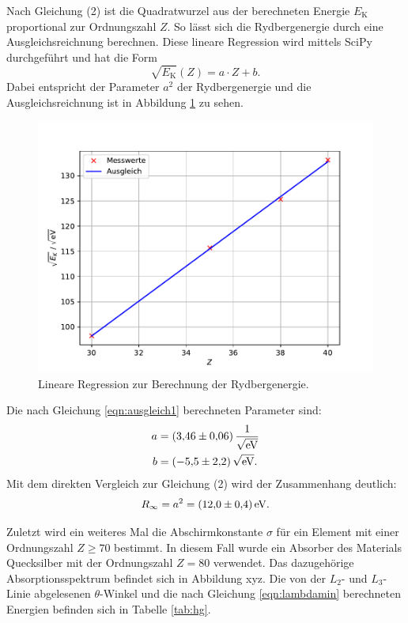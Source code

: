 \noindent Nach Gleichung (2) ist die Quadratwurzel aus der berechneten Energie $E_\text{K}$ proportional zur Ordnungszahl $Z$. So lässt sich die
Rydbergenergie durch eine Ausgleichsreichnung berechnen. Diese lineare Regression wird mittels SciPy durchgeführt und hat die Form
\begin{equation}
\label{eqn:ausgleich1}
  \sqrt{E_\text{K}}(Z) = a \cdot Z + b.
\end{equation}
Dabei entspricht der Parameter $a^2$ der Rydbergenergie und die Ausgleichsreichnung ist in Abbildung \ref{fig:ausgleich} zu sehen.
\begin{figure}[H]
  \center
  \includegraphics[scale = 0.75]{rydberg.pdf}
  \caption{Lineare Regression zur Berechnung der Rydbergenergie.}
  \label{fig:ausgleich}
\end{figure}
\noindent Die nach Gleichung \eqref{eqn:ausgleich1} berechneten Parameter sind:
\begin{align*}
a &= (\num{3.46 +- 0.06})\,\frac{1}{\sqrt{\si{\electronvolt}}} \\
b &= (\num{-5.5 +- 2.2})\,\sqrt{\si{\electronvolt}}.
\end{align*}
Mit dem direkten Vergleich zur Gleichung (2) wird der Zusammenhang deutlich:
\begin{align*}
R_\infty = a^2 = (\num{12.0 +- 0.4})\,\si{\electronvolt}.
\end{align*}

Zuletzt wird ein weiteres Mal die Abschirmkonstante $\sigma$ für ein Element mit einer Ordnungszahl $Z \geq 70$ bestimmt. In diesem Fall wurde ein Absorber des Materials
Quecksilber mit der Ordnungszahl $Z = 80$ verwendet. Das dazugehörige Absorptionsspektrum befindet sich in Abbildung xyz. Die von der $L_2$- und $L_3$-Linie abgelesenen $\theta$-Winkel
und die nach Gleichung \eqref{eqn:lambdamin} berechneten Energien befinden sich in Tabelle \ref{tab:hg}.

